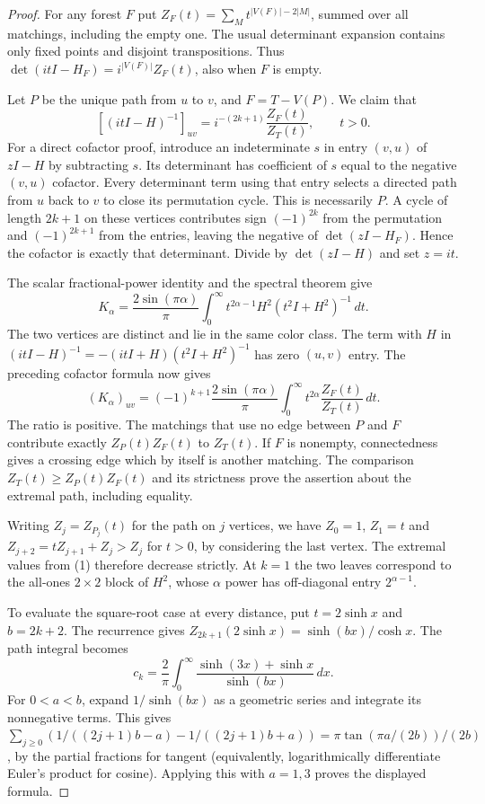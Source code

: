 \documentclass[11pt]{article}
\begin{document}
\begin{proof}
For any forest $F$ put $Z_F(t)=\sum_M t^{|V(F)|-2|M|}$, summed over all matchings, including the empty one. The usual determinant expansion contains only fixed points and disjoint transpositions. Thus $\det(itI-H_F)=i^{|V(F)|}Z_F(t)$, also when $F$ is empty.

Let $P$ be the unique path from $u$ to $v$, and $F=T-V(P)$. We claim that
\[
  [(itI-H)^{-1}]_{uv}=i^{-(2k+1)}\frac{Z_F(t)}{Z_T(t)},\qquad t>0.
\]
For a direct cofactor proof, introduce an indeterminate $s$ in entry $(v,u)$ of $zI-H$ by subtracting $s$. Its determinant has coefficient of $s$ equal to the negative $(v,u)$ cofactor. Every determinant term using that entry selects a directed path from $u$ back to $v$ to close its permutation cycle. This is necessarily $P$. A cycle of length $2k+1$ on these vertices contributes sign $(-1)^{2k}$ from the permutation and $(-1)^{2k+1}$ from the entries, leaving the negative of $\det(zI-H_F)$. Hence the cofactor is exactly that determinant. Divide by $\det(zI-H)$ and set $z=it$.

The scalar fractional-power identity and the spectral theorem give
\[
   K_\alpha=\frac{2\sin(\pi\alpha)}{\pi}
   \int_0^\infty t^{2\alpha-1} H^2(t^2 I+H^2)^{-1}\,dt .
\]
The two vertices are distinct and lie in the same color class. The term with $H$ in
$(itI-H)^{-1}=-(itI+H)(t^2 I+H^2)^{-1}$ has zero $(u,v)$ entry. The preceding cofactor formula now gives
\[
   (K_\alpha)_{uv}=(-1)^{k+1}\frac{2\sin(\pi\alpha)}{\pi}
        \int_0^\infty t^{2\alpha}\frac{Z_F(t)}{Z_T(t)}\,dt . \tag{1}
\]
The ratio is positive. The matchings that use no edge between $P$ and $F$ contribute exactly $Z_P(t) Z_F(t)$ to $Z_T(t)$. If $F$ is nonempty, connectedness gives a crossing edge which by itself is another matching. The comparison
$Z_T(t)\ge Z_P(t) Z_F(t)$ and its strictness prove the assertion about the extremal path, including equality.

Writing $Z_j=Z_{P_j}(t)$ for the path on $j$ vertices, we have $Z_0=1$, $Z_1=t$ and $Z_{j+2}=tZ_{j+1}+Z_j>Z_j$ for $t>0$, by considering the last vertex. The extremal values from (1) therefore decrease strictly. At $k=1$ the two leaves correspond to the all-ones $2\times2$ block of $H^2$, whose $\alpha$ power has off-diagonal entry $2^{\alpha-1}$.

To evaluate the square-root case at every distance, put $t=2\sinh x$ and $b=2k+2$. The recurrence gives $Z_{2k+1}(2\sinh x)=\sinh(bx)/\cosh x$. The path integral becomes
\[
 c_k=\frac{2}{\pi}\int_0^\infty
      \frac{\sinh(3x)+\sinh x}{\sinh(bx)}\,dx.
\]
For $0<a<b$, expand $1/\sinh(bx)$ as a geometric series and integrate its nonnegative terms. This gives
$\sum_{j\ge0} (1/((2j+1)b-a)-1/((2j+1)b+a))=\pi\tan(\pi a/(2b))/(2b)$, by the partial fractions for tangent (equivalently, logarithmically differentiate Euler's product for cosine). Applying this with $a=1,3$ proves the displayed formula.
\end{proof}
\end{document}
